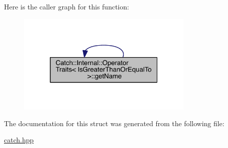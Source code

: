 Here is the caller graph for this function\+:\nopagebreak
\begin{figure}[H]
\begin{center}
\leavevmode
\includegraphics[width=241pt]{a00059_a76b6f6b0dbaf7d19ebb1b4b4891e719e_icgraph}
\end{center}
\end{figure}




The documentation for this struct was generated from the following file\+:\begin{DoxyCompactItemize}
\item 
\hyperlink{a00094}{catch.\+hpp}\end{DoxyCompactItemize}
